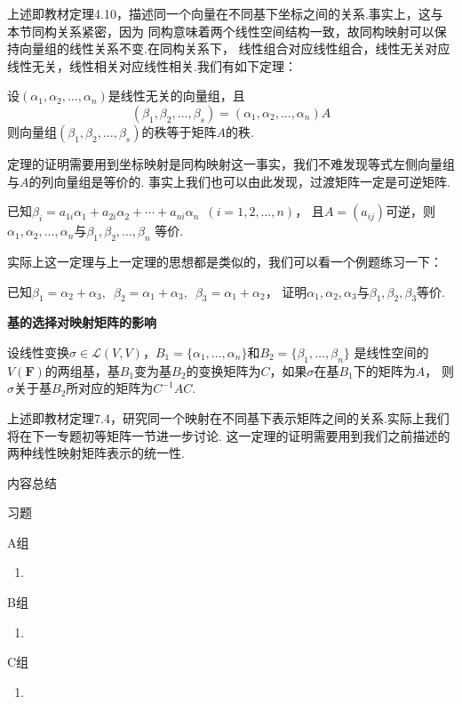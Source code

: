 上述即教材定理4.10，描述同一个向量在不同基下坐标之间的关系.事实上，这与本节同构关系紧密，因为
同构意味着两个线性空间结构一致，故同构映射可以保持向量组的线性关系不变.在同构关系下，
线性组合对应线性组合，线性无关对应线性无关，线性相关对应线性相关.我们有如下定理：
\begin{theorem}
    设$(\alpha_1,\alpha_2,\ldots,\alpha_n)$是线性无关的向量组，且
    \[(\beta_1,\beta_2,\ldots,\beta_s)=(\alpha_1,\alpha_2,\ldots,\alpha_n)A\]
    则向量组$(\beta_1,\beta_2,\ldots,\beta_s)$的秩等于矩阵$A$的秩.
\end{theorem}
定理的证明需要用到坐标映射是同构映射这一事实，我们不难发现等式左侧向量组与$A$的列向量组是等价的.
事实上我们也可以由此发现，过渡矩阵一定是可逆矩阵.
\begin{theorem}
    已知$\beta_i=a_{1i}\alpha_1+a_{2i}\alpha_2+\cdots+a_{ni}\alpha_n\enspace(i=1,2,\ldots,n)$，
    且$A=(a_{ij})$可逆，则$\alpha_1,\alpha_2,\ldots,\alpha_n$与$\beta_1,\beta_2,\ldots,\beta_n$
    等价.
\end{theorem}
实际上这一定理与上一定理的思想都是类似的，我们可以看一个例题练习一下：
\begin{example}
    已知$\beta_1=\alpha_2+\alpha_3,\enspace\beta_2=\alpha_1+\alpha_3,\enspace\beta_3=\alpha_1+\alpha_2$，
    证明$\alpha_1,\alpha_2,\alpha_3$与$\beta_1,\beta_2,\beta_3$等价.
\end{example}
\begin{theorem}
    \textbf{\heiti 基的选择对映射矩阵的影响}

    设线性变换$\sigma \in \mathcal{L}(V,V)$，$B_1=\{\alpha_1,\ldots,\alpha_n\}$和$B_2=\{\beta_1,\ldots,\beta_n\}$
    是线性空间的$V(\mathbf{F})$的两组基，基$B_1$变为基$B_2$的变换矩阵为$C$，如果$\sigma$在基$B_1$下的矩阵为$A$，
    则$\sigma$关于基$B_2$所对应的矩阵为$C^{-1}AC$.
\end{theorem}
上述即教材定理7.4，研究同一个映射在不同基下表示矩阵之间的关系.实际上我们将在下一专题初等矩阵一节进一步讨论.
这一定理的证明需要用到我们之前描述的两种线性映射矩阵表示的统一性.

\vspace{2ex}
\centerline{\heiti \Large 内容总结}

\vspace{2ex}

\centerline{\heiti \Large 习题}
\vspace{2ex}
{\kaishu }
\begin{flushright}
    \kaishu

\end{flushright}
\centerline{\heiti A组}
\begin{enumerate}
    \item
\end{enumerate}
\centerline{\heiti B组}
\begin{enumerate}
    \item
\end{enumerate}
\centerline{\heiti C组}
\begin{enumerate}
    \item
\end{enumerate}
